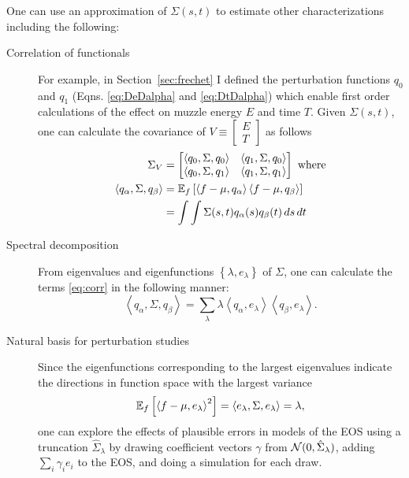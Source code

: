 \documentclass[]{article}
\newcommand{\normal}[2]{{\cal N}(#1,#2)} \newcommand{\La}{{\cal L}}
\newcommand{\field}[1]{\mathbb{#1}}
\newcommand{\EV}[2]{\field{E}_{#1}\left[#2\right]}
\newcommand\inner[2]{\left<#1,#2\right>}
\begin{document}
One can use an approximation of $\Sigma(s,t)$ to estimate other
characterizations including the following:
\begin{description}
\item[Correlation of functionals] For example, in
  Section~\ref{sec:frechet} I defined the perturbation functions $q_0$
  and $q_1$ (Eqns. \eqref{eq:DeDalpha} and \eqref{eq:DtDalpha}) which
  enable first order calculations of the effect on muzzle energy $E$ and
  time $T$. Given $\Sigma(s,t)$, one can calculate the covariance of
  $V \equiv \begin{bmatrix} E \\ T \end{bmatrix} $ as follows
  \begin{align}
    \Sigma_V &= 
  \begin{bmatrix}
    \inner{q_0,\Sigma}{q_0} & \inner{q_1,\Sigma}{q_0}\\
    \inner{q_0,\Sigma}{q_1} & \inner{q_1, \Sigma}{q_1}
  \end{bmatrix} \text{ where}\nonumber \\
  \inner{q_\alpha,\Sigma}{q_\beta} &=
  \EV{f}{\inner{f-\mean}{q_\alpha}\inner{f-\mean}{q_\beta}} \nonumber \\
    \label{eq:corr}
   &= \int\int \Sigma(s,t) q_\alpha(s) q_\beta(t) \,ds \,dt
\end{align}
\item[Spectral decomposition] From eigenvalues and eigenfunctions
  $\left\{\lambda, e_\lambda \right\}$ of $\Sigma$, one can
  calculate the terms \eqref{eq:corr} in the following manner:
  \begin{equation}
    \label{eq:spec1}
    \inner{q_\alpha, \Sigma}{q_\beta} = \sum_\lambda \lambda
    \inner{q_\alpha}{e_\lambda} \inner{q_\beta}{e_\lambda}.
  \end{equation}
\item[Natural basis for perturbation studies] Since the eigenfunctions
  corresponding to the largest eigenvalues indicate the directions in
  function space with the largest variance
  \begin{equation}
    \label{eq:spec2}
    \EV{f}{\inner{f-\mean}{e_\lambda}^2} = \inner{e_\lambda, \Sigma }{
      e_\lambda } = \lambda,
  \end{equation}
  one can explore the effects of plausible errors in models of the EOS
  using a truncation $\hat \Sigma_\lambda$ by drawing coefficient
  vectors $\gamma$ from $\normal{0}{\hat \Sigma_\lambda}$, adding
  $\sum_i \gamma_i e_i$ to the EOS, and doing a simulation for each
  draw.
\end{description}
\end{document}
